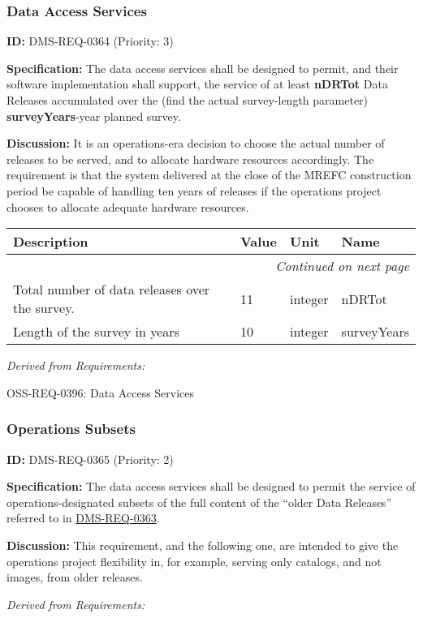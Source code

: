 \documentclass[SE,toc,lsstdraft]{lsstdoc}
\makeatletter
\newcommand{\paramname}[1]{\hspace{0pt}#1}
\newcommand{\unitname}[1]{\hspace{0pt}#1}
\newenvironment{parameters}[0]{%
\setlength\LTleft{0pt}
\setlength\LTright{\fill}
\begin{small}
\begin{longtable}[]{|p{0.49\textwidth}|l|p{0.6in}|p{1.70in}@{}|}

\hline \textbf{Description} & \textbf{Value} & \textbf{Unit} & \textbf{Name} \\ \hline
\endhead

\hline \multicolumn{4}{r}{\emph{Continued on next page}} \\
\endfoot

\hline\hline
\endlastfoot
}{%
\hline
\end{longtable}
\end{small}
}
\makeatother
\begin{document}
\subsubsection{Data Access Services}

\label{DMS-REQ-0364}
\textbf{ID:} DMS-REQ-0364 (Priority: 3)

\textbf{Specification:}
The data access services shall be designed to permit, and their software implementation shall support, the service of at least \textbf{nDRTot} Data Releases accumulated over the (find the actual survey-length parameter) \textbf{surveyYears}-year planned survey.

\textbf{Discussion:}
It is an operations-era decision to choose the actual number of releases to be served, and to allocate hardware resources accordingly.  The requirement is that the system delivered at the close of the MREFC construction period be capable of handling ten years of releases if the operations project chooses to allocate adequate hardware resources.

\begin{parameters}
Total number of data releases over the survey.
&
11
&
\unitname{%
integer
}
&
\paramname{%
nDRTot
} \\\hline
Length of the survey in years
&
10
&
\unitname{%
integer
}
&
\paramname{%
surveyYears
} \\\hline
\end{parameters}

\emph{Derived from Requirements:}

OSS-REQ-0396:
Data Access Services \newline

\subsubsection{Operations Subsets}

\label{DMS-REQ-0365}
\textbf{ID:} DMS-REQ-0365 (Priority: 2)

\textbf{Specification:}
The data access services shall be designed to permit the service of operations-designated subsets of the full content of the “older Data Releases” referred to in \hyperref[DMS-REQ-0363]{DMS-REQ-0363}.

\textbf{Discussion:}
This requirement, and the following one, are intended to give the operations project flexibility in, for example, serving only catalogs, and not images, from older releases.

\emph{Derived from Requirements:}
\end{document}

